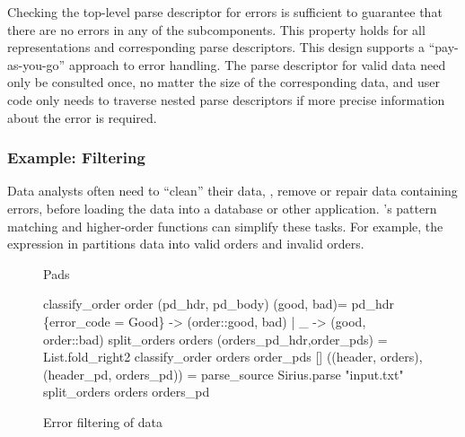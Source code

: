 Checking the top-level parse descriptor for errors is sufficient to
guarantee that there are no errors in any of the subcomponents.  This
property holds for all representations and corresponding parse
descriptors.  This design supports a ``pay-as-you-go'' approach to
error handling. The parse descriptor for valid data need only be
consulted once, no matter the size of the corresponding data, and user
code only needs to traverse nested parse descriptors if more
precise information about the error is required.

\subsubsection{Example: Filtering}
\label{sec:ex-filter}

Data analysts often need to ``clean'' their data, \ie{}, remove or
repair data containing errors, before loading the data into a database
or other application.  \ocaml{}'s pattern matching and higher-order
functions can simplify these tasks.  For example, the expression in
 partitions \dibbler{} data into valid
orders and invalid orders.  

\begin{figure}
\begin{code}\scriptsize
{} Pads

 classify_order order (pd\_hdr, pd\_body) (good, bad)=
    pd\_hdr 
    \{error_code = Good\} -> (order::good, bad)
   | _                  -> (good, order::bad)
 split_orders orders (orders_pd_hdr,order_pds) = 
   List.fold_right2 classify_order orders order_pds []
 ((header, orders),(header_pd, orders_pd)) = 
   parse_source Sirius.parse "input.txt"
split_orders orders orders_pd\end{code} 
\caption{Error filtering of \dibbler{} data}
\label{fig:ex-data-clean}
\end{figure}


